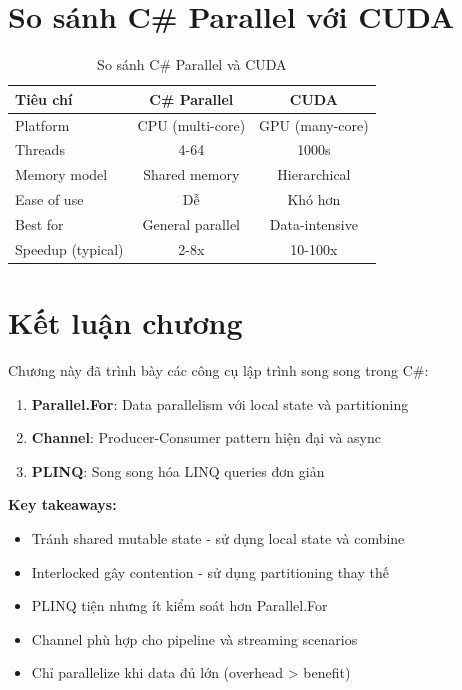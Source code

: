 \section{So sánh C\# Parallel với CUDA}

\begin{table}[H]
\centering
\caption{So sánh C\# Parallel và CUDA}
\label{tab:csharp_vs_cuda}
\begin{tabular}{@{}lcc@{}}
\toprule
\textbf{Tiêu chí} & \textbf{C\# Parallel} & \textbf{CUDA} \\
\midrule
Platform & CPU (multi-core) & GPU (many-core) \\
Threads & 4-64 & 1000s \\
Memory model & Shared memory & Hierarchical \\
Ease of use & Dễ & Khó hơn \\
Best for & General parallel & Data-intensive \\
Speedup (typical) & 2-8x & 10-100x \\
\bottomrule
\end{tabular}
\end{table}

\section{Kết luận chương}

Chương này đã trình bày các công cụ lập trình song song trong C\#:

\begin{enumerate}
    \item \textbf{Parallel.For}: Data parallelism với local state và partitioning
    \item \textbf{Channel}: Producer-Consumer pattern hiện đại và async
    \item \textbf{PLINQ}: Song song hóa LINQ queries đơn giản
\end{enumerate}

\textbf{Key takeaways:}
\begin{itemize}
    \item Tránh shared mutable state - sử dụng local state và combine
    \item Interlocked gây contention - sử dụng partitioning thay thế
    \item PLINQ tiện nhưng ít kiểm soát hơn Parallel.For
    \item Channel phù hợp cho pipeline và streaming scenarios
    \item Chỉ parallelize khi data đủ lớn (overhead > benefit)
\end{itemize}
